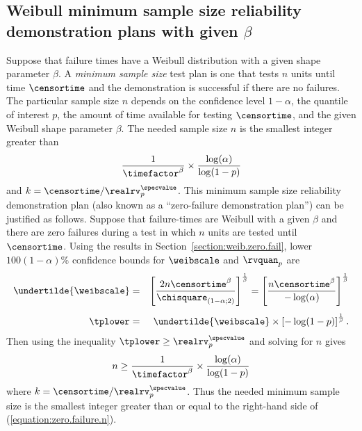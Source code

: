 \subsection{Weibull minimum sample size reliability demonstration
plans with given $\beta$}

Suppose that failure times have a Weibull distribution with a given
shape parameter $\beta$. A {\em minimum sample size} test plan is
one that tests $n$ units until time $\censortime$ and the demonstration
is successful if there are no failures. The particular sample size
$n$ depends on the confidence level $1-\alpha$, the quantile of
interest $p$, the amount of time available for testing
$\censortime$, and the given Weibull shape parameter $\beta$.  The
needed sample size $n$ is the smallest integer greater than
\begin{displaymath}
\frac{ 1 } {\timefactor^{\beta}  }
\times
\frac  {\log(\alpha)} { \log(1-p) }
\end{displaymath}
and $k=\censortime/\realrv_{p}^{\specvalue}$. 
This minimum sample size reliability demonstration plan (also known
as a ``zero-failure demonstration plan'') can be justified as
follows.  Suppose that failure-times are Weibull with a given
$\beta$ and there are zero failures during a test in which $n$ units
are tested until $\censortime$.  Using the results in
Section~\ref{section:weib.zero.fail}, lower $100(1-\alpha)\%$
confidence bounds for $\weibscale$ and $\rvquan_{p}$ are
\begin{eqnarray*}
\undertilde{\weibscale} &=&
\left[ \frac{2 n \censortime^{\beta}}
            {
\chisquare_{(1-\alpha;2)}}\right]^{\frac{1}{\beta}
            }
=
\left[ \frac{
n \censortime^{\beta} } { -\log(\alpha) } \right]^{\frac{1}{\beta}}
\\[1ex]
\tplower&=&\undertilde{\weibscale} 
\times
\left [
-\log(1-p)
\right]^{\frac{1}{\beta}}.
\end{eqnarray*}
Then using the inequality 
$\tplower \geq \realrv_{p}^{\specvalue}$ and solving for $n$ gives
\begin{equation}
\label{equation:zero.failure.n}
n \geq \frac{ 1 } {
\timefactor^{\beta} 
       }
\times
\frac  { 
\log(\alpha) 
       } { \log(1-p) }
\end{equation}
where $k=\censortime/\realrv_{p}^{\specvalue}$. Thus the needed
minimum sample size is the smallest integer greater than or equal to
the right-hand side of (\ref{equation:zero.failure.n}).

